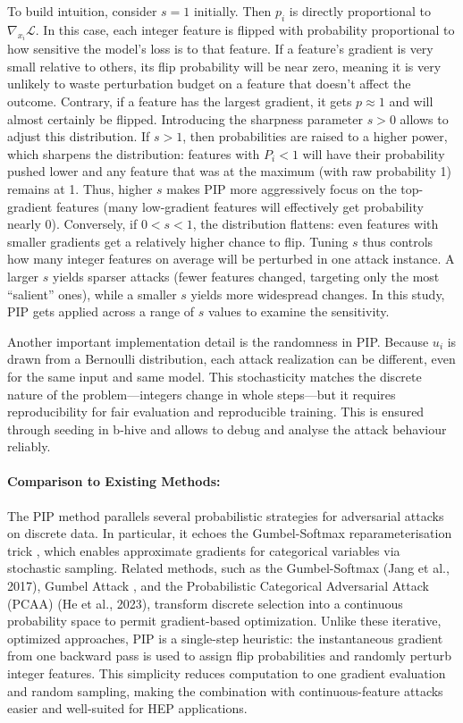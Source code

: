 To build intuition, consider $s=1$ initially. Then $p_i$ is directly proportional to 
$\nabla_{x_i} \mathcal{L}$. In this case, each integer feature is flipped with probability proportional to how sensitive the model’s loss is to that feature. If a feature’s gradient is very small relative to others, its flip probability will be near zero, meaning it is very unlikely to waste perturbation budget on a feature that doesn’t affect the outcome. Contrary, if a feature has the largest gradient, it gets $p\approx1$ and will almost certainly be flipped. Introducing the sharpness parameter $s>0$ allows to adjust this distribution. If $s>1$, then probabilities are raised to a higher power, which sharpens the distribution: features with $P_i<1$ will have their probability pushed lower and any feature that was at the maximum (with raw probability 1) remains at 1. Thus, higher $s$ makes PIP more aggressively focus on the top-gradient features (many low-gradient features will effectively get probability nearly 0). Conversely, if $0<s<1$, the distribution flattens: even features with smaller gradients get a relatively higher chance to flip. Tuning $s$ thus controls how many integer features on average will be perturbed in one attack instance. A larger $s$ yields sparser attacks (fewer features changed, targeting only the most “salient” ones), while a smaller $s$ yields more widespread changes. In this study, PIP gets applied across a range of $s$ values to examine the sensitivity.

Another important implementation detail is the randomness in PIP. Because $u_i$ is drawn from a Bernoulli distribution, each attack realization can be different, even for the same input and same model. This stochasticity matches the discrete nature of the problem—integers change in whole steps—but it requires reproducibility for fair evaluation and reproducible training. This is ensured through seeding in b-hive and allows to debug and analyse the attack behaviour reliably.


\paragraph{Comparison to Existing Methods:}
The PIP method parallels several probabilistic strategies for adversarial attacks on discrete data. In particular, it echoes the Gumbel-Softmax reparameterisation trick \cite{xu2023probabilisticcategoricaladversarialattack}, which enables approximate gradients for categorical variables via stochastic sampling. Related methods, such as the Gumbel-Softmax (Jang et al., 2017), Gumbel Attack \cite{yang2018greedyattackgumbelattack}, and the Probabilistic Categorical Adversarial Attack (PCAA) (He et al., 2023), transform discrete selection into a continuous probability space to permit gradient-based optimization. Unlike these iterative, optimized approaches, PIP is a single-step heuristic: the instantaneous gradient from one backward pass is used to assign flip probabilities and randomly perturb integer features. This simplicity reduces computation to one gradient evaluation and random sampling, making the combination with continuous-feature attacks easier and well-suited for HEP applications.

